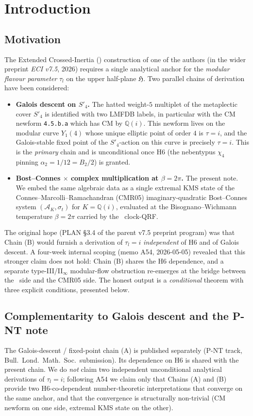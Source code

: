 \documentclass[12pt]{amsart}
\theoremstyle{definition}
\newcommand{\Q}{\mathbb{Q}}
\newcommand{\DEHK}{\mathrm{DEHK}}
\newcommand{\ECI}{\mathrm{ECI}}
\newcommand{\lmfdb}[1]{\texttt{#1}}
\begin{document}
\section{Introduction}
\label{sec:intro}

\subsection{Motivation}
The Extended Crossed-Inertia (\ECI) construction of one of the
authors (in the wider preprint \emph{ECI v7.5}, 2026) requires a
single analytical anchor for the \emph{modular flavour parameter}
$\tau_l$ on the upper half-plane $\mathfrak{H}$. Two parallel
chains of derivation have been considered:
\begin{itemize}
\item[(A)] \textbf{Galois descent on $S'_4$.} The hatted
  weight-$5$ multiplet of the metaplectic cover $S'_4$ is identified
  with two LMFDB labels, in particular with the CM newform
  \lmfdb{4.5.b.a} which has CM by $\Q(i)$. This newform lives on
  the modular curve $Y_1(4)$ whose unique elliptic point of order
  $4$ is $\tau = i$, and the Galois-stable fixed point of the
  $S'_4$-action on this curve is precisely $\tau = i$. This is the
  \emph{primary} chain and is unconditional once H6 (the nebentypus
  $\chi_4$ pinning $\alpha_2 = 1/12 = B_2/2$) is granted.
\item[(B)] \textbf{Bost--Connes $\times$ complex multiplication
  at $\beta = 2\pi$.} The present note. We embed the same
  algebraic data as a single extremal KMS state of the
  Connes--Marcolli--Ramachandran (CMR05) imaginary-quadratic
  Bost--Connes system $(\mathcal{A}_K, \sigma_t)$ for $K = \Q(i)$,
  evaluated at the Bisognano--Wichmann temperature $\beta = 2\pi$
  carried by the \DEHK\ clock-QRF.
\end{itemize}

The original hope (PLAN \S3.4 of the parent v7.5 preprint program)
was that Chain (B) would furnish a derivation of $\tau_l = i$
\emph{independent} of H6 and of Galois descent. A four-week
internal scoping (memo A54, 2026-05-05) revealed that this stronger
claim does not hold: Chain (B) shares the H6 dependence, and a
separate type-III/II${}_\infty$ modular-flow obstruction
re-emerges at the bridge between the \DEHK\ side and the CMR05
side. The honest output is a \emph{conditional} theorem with three
explicit conditions, presented below.

\subsection{Complementarity to Galois descent and the P-NT note}
\label{sec:complementarity}
The Galois-descent / fixed-point chain (A) is published separately
(P-NT track, Bull.\ Lond.\ Math.\ Soc.\ submission). Its dependence
on H6 is shared with the present chain. We do \emph{not} claim two
independent unconditional analytical derivations of $\tau_l=i$;
following A54 we claim only that Chains (A) and (B) provide two
H6-co-dependent number-theoretic interpretations that converge on
the same anchor, and that the convergence is structurally
non-trivial (CM newform on one side, extremal KMS state on the
other).
\end{document}
